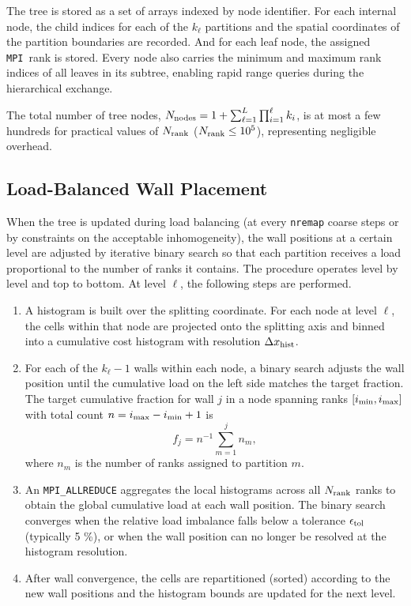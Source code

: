 \documentclass[fleqn,usenatbib]{mnras}
\newcommand{\nrank}{N_{\rm rank}}
\newcommand{\code}[1]{\texttt{#1}}
\newcommand{\mpi}[0]{\texttt{MPI}}
\begin{document}
The tree is stored as a set of arrays indexed by node identifier.
For each internal node, the child indices for each of the $k_\ell$
partitions and the spatial coordinates of the partition boundaries
are recorded. And for each leaf node, the assigned \mpi\ rank is stored.
Every node also carries the minimum and maximum rank indices of all
leaves in its subtree, enabling rapid range queries during the
hierarchical exchange.

The total number of tree nodes,
$N_{\rm nodes} = 1 + \sum_{\ell=1}^{L} \prod_{i=1}^{\ell} k_i$,
is at most a few hundreds for practical values of $\nrank$
($\nrank \leq 10^5$), representing negligible overhead.


\subsection{Load-Balanced Wall Placement}
\label{sec:ksec_loadbal}

When the tree is updated during load balancing (at every \code{nremap}
coarse steps or by constraints on the acceptable inhomogeneity), the wall positions at a certain level are adjusted by iterative
binary search so that each partition receives a load proportional to the
number of ranks it contains. The procedure operates level by level and top to bottom. At level $\ell$,
the following steps are performed.

\begin{enumerate}
\item A histogram is built over the splitting coordinate. For each
  node at level $\ell$, the cells within that node are projected onto the
  splitting axis and binned into a cumulative cost histogram with
  resolution $\Delta x_{\rm hist}$.

\item For each of the $k_\ell - 1$ walls within each node, a binary
  search adjusts the wall position until the cumulative
  load on the left side matches the target fraction. The target
  cumulative fraction for wall $j$ in a node spanning ranks
  $[i_{\rm min}, i_{\rm max}]$ with total count
  $n = i_{\rm max} - i_{\rm min} + 1$ is
  \begin{equation}
  f_j = n^{-1}\sum_{m=1}^{j} n_m,
  \label{eq:target_frac}
  \end{equation}
  where $n_m$ is the number of ranks assigned to partition $m$.

\item An \code{MPI\_ALLREDUCE} aggregates the local histograms across
  all $\nrank$ ranks to obtain the global cumulative load at each wall
  position. The binary search converges when the relative load imbalance
 falls below a
  tolerance $\epsilon_{\rm tol}$ (typically 5 \%), or when the
  wall position can no longer be resolved at the histogram resolution.

\item After wall convergence, the cells are repartitioned (sorted)
  according to the new wall positions and the histogram bounds are
  updated for the next level.
\end{enumerate}
\end{document}
